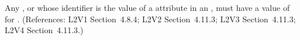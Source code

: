 Any \Compartment, \Species or \Parameter whose identifier is the value of a
 attribute in an \AssignmentRule, must have a value of
 for .  (References: L2V1 Section~4.8.4; L2V2
Section~4.11.3; L2V3 Section~4.11.3; L2V4 Section~4.11.3.)
